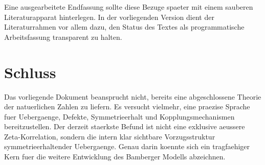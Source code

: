 \documentclass[11pt,a4paper]{article}
\theoremstyle{definition}
\begin{document}
Eine ausgearbeitete Endfassung sollte diese Bezuge spaeter mit einem sauberen Literaturapparat hinterlegen. In der vorliegenden Version dient der Literaturrahmen vor allem dazu, den Status des Textes als programmatische Arbeitsfassung transparent zu halten.

\section{Schluss}

Das vorliegende Dokument beansprucht nicht, bereits eine abgeschlossene Theorie der natuerlichen Zahlen zu liefern. Es versucht vielmehr, eine praezise Sprache fuer Uebergaenge, Defekte, Symmetrieerhalt und Kopplungsmechanismen bereitzustellen. Der derzeit staerkste Befund ist nicht eine exklusive aeussere Zeta-Korrelation, sondern die intern klar sichtbare Vorzugsstruktur symmetrieerhaltender Uebergaenge. Genau darin koennte sich ein tragfaehiger Kern fuer die weitere Entwicklung des Bamberger Modells abzeichnen.
\end{document}
